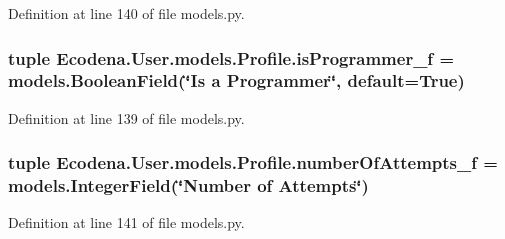 Definition at line 140 of file models.py.

\hypertarget{class_ecodena_1_1_user_1_1models_1_1_profile_ab696510431c027177451da1e4a6bdc0b}{
\subsubsection[{isProgrammer\_\-f}]{\setlength{\rightskip}{0pt plus 5cm}tuple {\bf Ecodena.User.models.Profile.isProgrammer\_\-f} = models.BooleanField(\char`\"{}Is a {\bf Programmer}\char`\"{}, default=True)}}
\label{d2/de8/class_ecodena_1_1_user_1_1models_1_1_profile_ab696510431c027177451da1e4a6bdc0b}


Definition at line 139 of file models.py.

\hypertarget{class_ecodena_1_1_user_1_1models_1_1_profile_a7cfe404d70a33ce89be1a5d51c9cafba}{
\subsubsection[{numberOfAttempts\_\-f}]{\setlength{\rightskip}{0pt plus 5cm}tuple {\bf Ecodena.User.models.Profile.numberOfAttempts\_\-f} = models.IntegerField(\char`\"{}Number of Attempts\char`\"{})}}
\label{d2/de8/class_ecodena_1_1_user_1_1models_1_1_profile_a7cfe404d70a33ce89be1a5d51c9cafba}


Definition at line 141 of file models.py.

\hypertarget{class_ecodena_1_1_user_1_1models_1_1_profile_a325bcac723862d8a41a83b45b2de5afa}{
\subsubsection[{numberOfAttempts\_\-f}]{}}
\label{d2/de8/class_ecodena_1_1_user_1_1models_1_1_profile_a325bcac723862d8a41a83b45b2de5afa}


